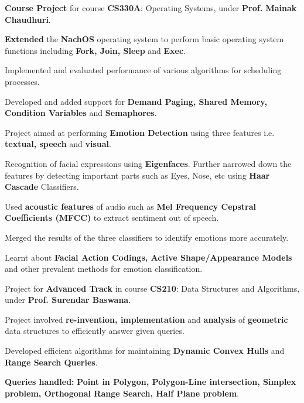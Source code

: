 \documentclass[a4paper]{norm-resume}
\begin{document}
	\vspace{2mm}

	   
	\begin{tightitemize}
	\small
	{
	\item \textbf{Course Project} for course \textbf{CS330A}: Operating Systems, under \textbf{Prof. Mainak Chaudhuri}.
	\item \textbf{Extended} the \textbf{NachOS} operating system to perform basic operating system functions including \textbf{Fork, Join, Sleep} and \textbf{Exec}. 
	\item Implemented and evaluated performance of various algorithms for scheduling processes.
	\item Developed and added support for \textbf{Demand Paging, Shared Memory, Condition Variables} and \textbf{Semaphores}.	
	}
	\end{tightitemize}
		
	\vspace{2mm}
	
	   \descript{May '14 - Jun '14}
	\begin{tightitemize}
	\small
	{
	\item Project aimed at performing \textbf{Emotion Detection} using three features i.e. \textbf{textual, speech} and \textbf{visual}.
	\item Recognition of facial expressions using \textbf{Eigenfaces}. Further narrowed down the features by detecting important parts such as Eyes, Nose, etc using \textbf{Haar Cascade} Classifiers.
	\item Used \textbf{acoustic features} of audio such as \textbf{Mel Frequency Cepstral Coefficients (MFCC)} to extract sentiment out of speech.
	\item Merged the results of the three classifiers to identify emotions more accurately.
	\item Learnt about \textbf{Facial Action Codings, Active Shape/Appearance Models} and other prevalent methods for emotion classification.
	}
	\end{tightitemize}
		
	\vspace{2mm}
	
	   \descript{Sep '14 - Nov '14}
	\begin{tightitemize}
	\small
	{
	\item Project for \textbf{Advanced Track} in course \textbf{CS210}: Data Structures and Algorithms, under \textbf{Prof. Surendar Baswana}.
	\item Project involved \textbf{re-invention, implementation} and \textbf{analysis} of \textbf{geometric} data structures to efficiently answer given queries.
	\item Developed efficient algorithms for maintaining \textbf{Dynamic Convex Hulls} and \textbf{Range Search Queries}.
	\item \textbf{Queries handled:} \textbf{Point in Polygon, Polygon-Line intersection, Simplex problem, Orthogonal Range Search, Half Plane problem}.
	}
	\end{tightitemize}
 		
\end{document}
